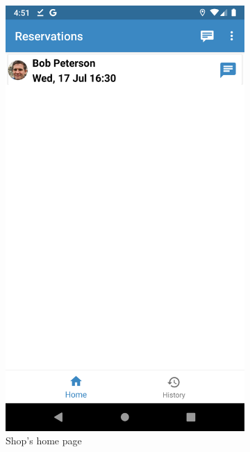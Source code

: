 \begin{figure}[h]
\centering
\begin{subfigure}{.5\textwidth}
  \centering
  \includegraphics[height=.4\textheight, keepaspectratio=true]{Img/Screens/Shop_Home}
  \caption{Shop's home page}
\end{subfigure}%
\begin{subfigure}{.5\textwidth}
  \centering

\end{subfigure}
\end{figure}

